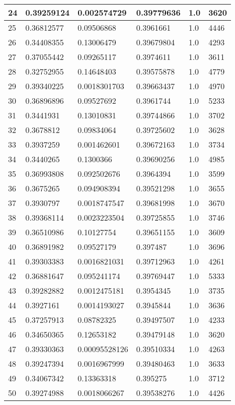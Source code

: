 \begin{longtable}{|l|l|l|l|l|l|}
24 & 0.39259124 & 0.002574729 & 0.39779636 & 1.0 & 3620 \\ \hline 
25 & 0.36812577 & 0.09506868 & 0.3961661 & 1.0 & 4446 \\ \hline 
26 & 0.34408355 & 0.13006479 & 0.39679804 & 1.0 & 4293 \\ \hline 
27 & 0.37055442 & 0.09265117 & 0.3974611 & 1.0 & 3611 \\ \hline 
28 & 0.32752955 & 0.14648403 & 0.39575878 & 1.0 & 4779 \\ \hline 
29 & 0.39340225 & 0.0018301703 & 0.39663437 & 1.0 & 4970 \\ \hline 
30 & 0.36896896 & 0.09527692 & 0.3961744 & 1.0 & 5233 \\ \hline 
31 & 0.3441931 & 0.13010831 & 0.39744866 & 1.0 & 3702 \\ \hline 
32 & 0.3678812 & 0.09834064 & 0.39725602 & 1.0 & 3628 \\ \hline 
33 & 0.3937259 & 0.001462601 & 0.39672163 & 1.0 & 3734 \\ \hline 
34 & 0.3440265 & 0.1300366 & 0.39690256 & 1.0 & 4985 \\ \hline 
35 & 0.36993808 & 0.092502676 & 0.3964394 & 1.0 & 3599 \\ \hline 
36 & 0.3675265 & 0.094908394 & 0.39521298 & 1.0 & 3655 \\ \hline 
37 & 0.3930797 & 0.0018747547 & 0.39681998 & 1.0 & 3670 \\ \hline 
38 & 0.39368114 & 0.0023223504 & 0.39725855 & 1.0 & 3746 \\ \hline 
39 & 0.36510986 & 0.10127754 & 0.39651155 & 1.0 & 3609 \\ \hline 
40 & 0.36891982 & 0.09527179 & 0.397487 & 1.0 & 3696 \\ \hline 
41 & 0.39303383 & 0.0016821031 & 0.39712963 & 1.0 & 4261 \\ \hline 
42 & 0.36881647 & 0.095241174 & 0.39769447 & 1.0 & 5333 \\ \hline 
43 & 0.39282882 & 0.0012475181 & 0.3954345 & 1.0 & 3735 \\ \hline 
44 & 0.3927161 & 0.0014193027 & 0.3945844 & 1.0 & 3636 \\ \hline 
45 & 0.37257913 & 0.08782325 & 0.39497507 & 1.0 & 4233 \\ \hline 
46 & 0.34650365 & 0.12653182 & 0.39479148 & 1.0 & 3620 \\ \hline 
47 & 0.39330363 & 0.00095528126 & 0.39510334 & 1.0 & 4263 \\ \hline 
48 & 0.39247394 & 0.0016967999 & 0.39480463 & 1.0 & 3633 \\ \hline 
49 & 0.34067342 & 0.13363318 & 0.395275 & 1.0 & 3712 \\ \hline 
50 & 0.39274988 & 0.0018066267 & 0.39538276 & 1.0 & 4426 \\ \hline 
\end{longtable}